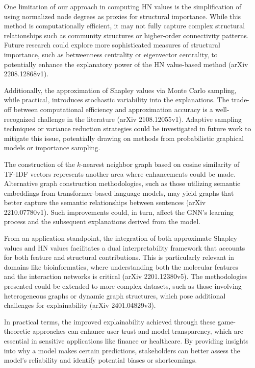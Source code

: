\documentclass{article}
\begin{document}
One limitation of our approach in computing HN values is the simplification of using normalized node degrees as proxies for structural importance. While this method is computationally efficient, it may not fully capture complex structural relationships such as community structures or higher-order connectivity patterns. Future research could explore more sophisticated measures of structural importance, such as betweenness centrality or eigenvector centrality, to potentially enhance the explanatory power of the HN value-based method (arXiv 2208.12868v1).

Additionally, the approximation of Shapley values via Monte Carlo sampling, while practical, introduces stochastic variability into the explanations. The trade-off between computational efficiency and approximation accuracy is a well-recognized challenge in the literature (arXiv 2108.12055v1). Adaptive sampling techniques or variance reduction strategies could be investigated in future work to mitigate this issue, potentially drawing on methods from probabilistic graphical models or importance sampling.

The construction of the \( k \)-nearest neighbor graph based on cosine similarity of TF-IDF vectors represents another area where enhancements could be made. Alternative graph construction methodologies, such as those utilizing semantic embeddings from transformer-based language models, may yield graphs that better capture the semantic relationships between sentences (arXiv 2210.07780v1). Such improvements could, in turn, affect the GNN's learning process and the subsequent explanations derived from the model.

From an application standpoint, the integration of both approximate Shapley values and HN values facilitates a dual interpretability framework that accounts for both feature and structural contributions. This is particularly relevant in domains like bioinformatics, where understanding both the molecular features and the interaction networks is critical (arXiv 2201.12380v5). The methodologies presented could be extended to more complex datasets, such as those involving heterogeneous graphs or dynamic graph structures, which pose additional challenges for explainability (arXiv 2401.04829v3).

In practical terms, the improved explainability achieved through these game-theoretic approaches can enhance user trust and model transparency, which are essential in sensitive applications like finance or healthcare. By providing insights into why a model makes certain predictions, stakeholders can better assess the model's reliability and identify potential biases or shortcomings.
\end{document}
